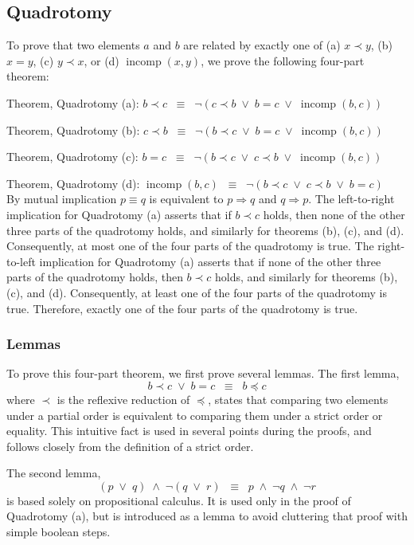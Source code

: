 \documentclass[12pt, fleqn, leqno]{article}
\newcommand{\equivss}{\ensuremath{\;\;\equiv\;\;}}  %
\newcommand{\lors}{\ensuremath{\;\lor\;}}           %
\newcommand{\lands}{\ensuremath{\;\land\;}}         %
\newcommand{\impl}{\ensuremath{\Rightarrow}}        %
\DeclareMathOperator{\incomp}{incomp}
\begin{document}
\subsection{Quadrotomy} \label {Quadrotomy}

To prove that two elements $a$ and $b$ are related by exactly one of (a) $x \prec y$, (b) $x=y$, (c) $y\prec x$, or (d) $\incomp(x,y)$, we prove the following four-part theorem:

Theorem, Quadrotomy (a): $b \prec c \equivss \lnot(c \prec b \lors b = c \lors \incomp(b, c))$

Theorem, Quadrotomy (b): $c \prec b \equivss \lnot(b \prec c \lors b = c \lors \incomp(b, c))$

Theorem, Quadrotomy (c): $b = c \equivss \lnot(b \prec c \lors c \prec b \lors \incomp(b, c))$

Theorem, Quadrotomy (d): $\incomp(b, c) \equivss \lnot(b \prec c \lors c \prec b \lors b = c)$\\
By mutual implication $p\equiv q$ is equivalent to $p\impl q$ and $q\impl p$.
The left-to-right implication for Quadrotomy (a) asserts that if $b\prec c$ holds, then none of the other three parts of the quadrotomy holds, and similarly for theorems (b), (c), and (d).
Consequently, at most one of the four parts of the quadrotomy is true.
The right-to-left implication for Quadrotomy (a) asserts that if none of the other three parts of the quadrotomy holds, then $b\prec c$ holds, and similarly for theorems (b), (c), and (d).
Consequently, at least one of the four parts of the quadrotomy is true.
Therefore, exactly one of the four parts of the quadrotomy is true.

\subsubsection{Lemmas}

To prove this four-part theorem, we first prove several lemmas.
The first lemma,
\[
b \prec c \lors b = c \equivss b \preceq c
\]
where $\prec$ is the reflexive reduction of $\preceq$, states that comparing two elements under a partial order is equivalent to comparing them under a strict order or equality.
This intuitive fact is used in several points during the proofs, and follows closely from the definition of a strict order.

The second lemma,
\[
(p \lors q) \lands \lnot (q \lors r) \equivss p \lands \lnot q \lands \lnot r
\]
is based solely on propositional calculus.
It is used only in the proof of Quadrotomy (a), but is introduced as a lemma to avoid cluttering that proof with simple boolean steps.
\end{document}
